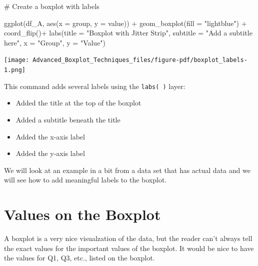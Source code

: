 \documentclass[
  letterpaper,
  DIV=11,
  numbers=noendperiod]{scrreprt}
\newenvironment{Shaded}{\begin{snugshade}}{\end{snugshade}}
\newcommand{\AttributeTok}[1]{\textcolor[rgb]{0.40,0.45,0.13}{#1}}
\newcommand{\CommentTok}[1]{\textcolor[rgb]{0.37,0.37,0.37}{#1}}
\newcommand{\FunctionTok}[1]{\textcolor[rgb]{0.28,0.35,0.67}{#1}}
\newcommand{\NormalTok}[1]{\textcolor[rgb]{0.00,0.23,0.31}{#1}}
\newcommand{\SpecialCharTok}[1]{\textcolor[rgb]{0.37,0.37,0.37}{#1}}
\newcommand{\StringTok}[1]{\textcolor[rgb]{0.13,0.47,0.30}{#1}}
\providecommand{\tightlist}{%
  \setlength{\itemsep}{0pt}\setlength{\parskip}{0pt}}\usepackage{longtable,booktabs,array}
\begin{document}
\begin{Shaded}
\begin{Highlighting}[]
\CommentTok{\# Create a boxplot with labels}

\FunctionTok{ggplot}\NormalTok{(df\_A, }\FunctionTok{aes}\NormalTok{(}\AttributeTok{x =}\NormalTok{ group, }\AttributeTok{y =}\NormalTok{ value)) }\SpecialCharTok{+}
  \FunctionTok{geom\_boxplot}\NormalTok{(}\AttributeTok{fill =} \StringTok{"lightblue"}\NormalTok{) }\SpecialCharTok{+}
  \FunctionTok{coord\_flip}\NormalTok{()}\SpecialCharTok{+}
  \FunctionTok{labs}\NormalTok{(}\AttributeTok{title =} \StringTok{"Boxplot with Jitter Strip"}\NormalTok{,}
       \AttributeTok{subtitle =} \StringTok{"Add a subtitle here"}\NormalTok{,}
       \AttributeTok{x =} \StringTok{"Group"}\NormalTok{,}
       \AttributeTok{y =} \StringTok{"Value"}\NormalTok{)}
\end{Highlighting}
\end{Shaded}

\begin{center}
\texttt{[image: Advanced\_Boxplot\_Techniques\_files/figure-pdf/boxplot\_labels-1.png]}
\end{center}

This command adds several labels using the \texttt{labs(\ )} layer:

\begin{itemize}
\tightlist
\item
  Added the title at the top of the boxplot
\item
  Added a subtitle beneath the title
\item
  Added the x-axis label
\item
  Added the y-axis label
\end{itemize}

We will look at an example in a bit from a data set that has actual data
and we will see how to add meaningful labels to the boxplot.

\section*{Values on the Boxplot}\label{values-on-the-boxplot}


A boxplot is a very nice visualzation of the data, but the reader can't
always tell the exact values for the important values of the boxplot. It
would be nice to have the values for Q1, Q3, etc., listed on the
boxplot.
\end{document}
